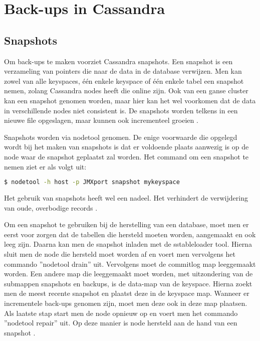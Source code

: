 \chapter{Back-ups in Cassandra}
\label{ch:cassandra_backups}

\section{Snapshots}
Om back-ups te maken voorziet Cassandra snapshots.
Een snapshot is een verzameling van pointers die naar de data in de database verwijzen.
Men kan zowel van alle keyspaces, één enkele keyspace of één enkele tabel een snapshot nemen, zolang Cassandra nodes heeft die online zijn.
Ook van een ganse cluster kan een snapshot genomen worden, maar hier kan het wel voorkomen dat de data in verschillende nodes niet consistent is.
De snapshots worden telkens in een nieuwe file opgeslagen, maar kunnen ook incrementeel groeien \citep{DataStax2016Snapshot}.

Snapshots worden via nodetool genomen.
De enige voorwaarde die opgelegd wordt bij het maken van snapshots is dat er voldoende plaats aanwezig is op de node waar de snapshot geplaatst zal worden.
Het command om een snapshot te nemen ziet er als volgt uit:

\begin{lstlisting}[language=Bash, breaklines=true]
$ nodetool -h host -p JMXport snapshot mykeyspace
\end{lstlisting}

Het gebruik van snapshots heeft wel een nadeel.
Het verhindert de verwijdering van oude, overbodige records \citep{DataStax2016Snapshot}.

Om een snapshot te gebruiken bij de herstelling van een database, moet men er eerst voor zorgen dat de tabellen die hersteld moeten worden, aangemaakt en ook leeg zijn.
Daarna kan men de snapshot inladen met de sstableloader tool.
Hierna sluit men de node die hersteld moet worden af en voert men vervolgens het commando ''nodetool drain'' uit.
Vervolgens moet de commitlog map leeggemaakt worden.
Een andere map die leeggemaakt moet worden, met uitzondering van de submappen snapshots en backups, is de data-map van de keyspace.
Hierna zoekt men de meest recente snapshot en plaatst deze in de keyspace map.
Wanneer er incrementele back-ups genomen zijn, moet men deze ook in deze map plaatsen.
Als laatste stap start men de node opnieuw op en voert men het commando ''nodetool repair'' uit.
Op deze manier is node hersteld aan de hand van een snapshot \citep{DataStax2016Snapshot}.

